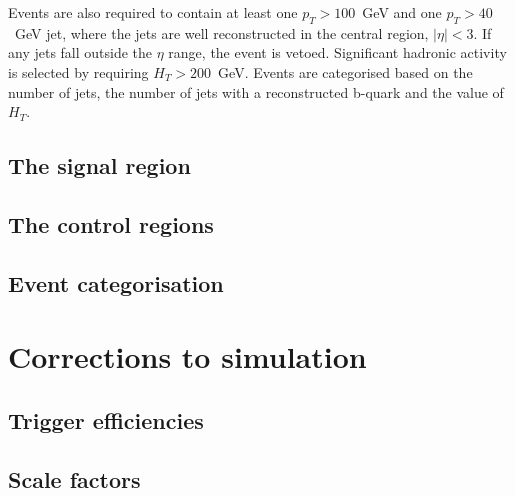 Events are also required to contain at least one $p_T>100$~GeV and one
$p_T>40$~GeV jet, where the jets are well reconstructed in the central
region, $|\eta|<3$. If any jets fall outside the $\eta$ range, the
event is vetoed. Significant hadronic activity is selected by
requiring $H_T>200$~GeV. Events are categorised based on the number of
jets, the number of jets with a reconstructed b-quark and the value of
$H_T$. 

\subsection{The signal region}
\label{sec:signalregion}


\subsection{The control regions}


\subsection{Event categorisation}


\section{Corrections to simulation} %



\subsection{Trigger efficiencies}


\subsection{Scale factors}


